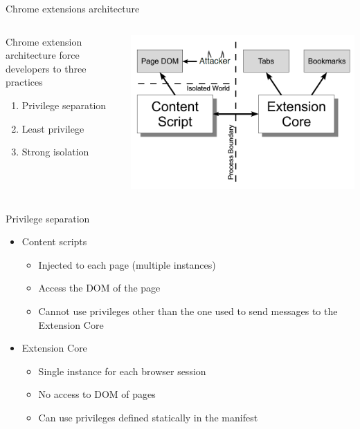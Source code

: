 \documentclass[11pt]{beamer}
\begin{document}

\begin{frame}{Chrome extensions architecture}
\begin{columns}[T]
\begin{column}{.48\textwidth}
Chrome extension architecture force developers to three practices
\begin{enumerate}
\item Privilege separation
\item Least privilege
\item Strong isolation
\end{enumerate}
\end{column}%
\begin{column}{.48\textwidth}
\includegraphics[scale=0.25]{Images/StrongIsolation.png}
\end{column}%
\end{columns}
\end{frame}

\begin{frame}{Privilege separation}
\begin{itemize}
\item Content scripts
\begin{itemize}
\item Injected to each page (multiple instances)
\item Access the DOM of the page
\item Cannot use privileges other than the one used to send messages to the Extension Core
\end{itemize}
\item Extension Core
\begin{itemize}
\item Single instance for each browser session
\item No access to DOM of pages
\item Can use privileges defined statically in the manifest
\end{itemize}
\end{itemize}
\end{frame}
\end{document}
